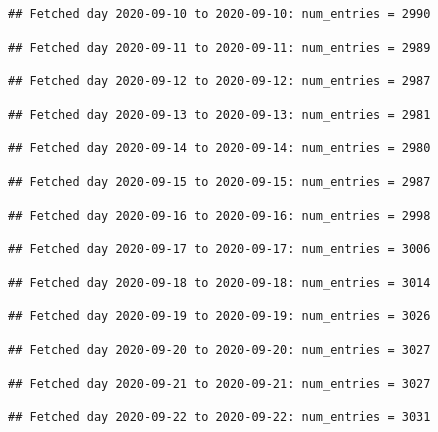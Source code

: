 \documentclass[]{article}
\begin{document}
\begin{verbatim}
## Fetched day 2020-09-10 to 2020-09-10: num_entries = 2990
\end{verbatim}

\begin{verbatim}
## Fetched day 2020-09-11 to 2020-09-11: num_entries = 2989
\end{verbatim}

\begin{verbatim}
## Fetched day 2020-09-12 to 2020-09-12: num_entries = 2987
\end{verbatim}

\begin{verbatim}
## Fetched day 2020-09-13 to 2020-09-13: num_entries = 2981
\end{verbatim}

\begin{verbatim}
## Fetched day 2020-09-14 to 2020-09-14: num_entries = 2980
\end{verbatim}

\begin{verbatim}
## Fetched day 2020-09-15 to 2020-09-15: num_entries = 2987
\end{verbatim}

\begin{verbatim}
## Fetched day 2020-09-16 to 2020-09-16: num_entries = 2998
\end{verbatim}

\begin{verbatim}
## Fetched day 2020-09-17 to 2020-09-17: num_entries = 3006
\end{verbatim}

\begin{verbatim}
## Fetched day 2020-09-18 to 2020-09-18: num_entries = 3014
\end{verbatim}

\begin{verbatim}
## Fetched day 2020-09-19 to 2020-09-19: num_entries = 3026
\end{verbatim}

\begin{verbatim}
## Fetched day 2020-09-20 to 2020-09-20: num_entries = 3027
\end{verbatim}

\begin{verbatim}
## Fetched day 2020-09-21 to 2020-09-21: num_entries = 3027
\end{verbatim}

\begin{verbatim}
## Fetched day 2020-09-22 to 2020-09-22: num_entries = 3031
\end{verbatim}
\end{document}
